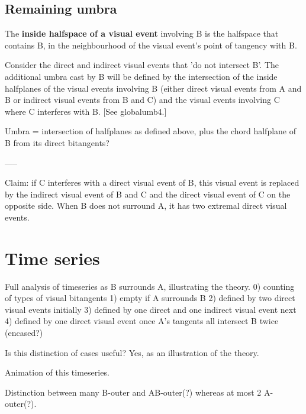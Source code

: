 \documentclass[12pt]{article}
\begin{document}
\subsection{Remaining umbra}

\begin{defn2}
The {\bf inside halfspace of a visual event} involving B is the halfspace that contains B,
in the neighbourhood of the visual event's point of tangency with B.
\end{defn2}

Consider the direct and indirect visual events that 'do not intersect B'.
The additional umbra cast by B will be defined by the intersection 
of the inside halfplanes of the visual events involving B (either direct visual
events from A and B or indirect visual events from B and C)
and the visual events involving C where C interferes with B.
[See globalumb4.]

Umbra = intersection of halfplanes as defined above, plus the chord halfplane of B
from its direct bitangents?

-----

Claim: if C interferes with a direct visual event of B, this visual event is replaced
       by the indirect visual event of B and C and the direct visual event of C on
       the opposite side.
       When B does not surround A, it has two extremal direct visual events.


\clearpage


\section{Time series}

Full analysis of timeseries as B surrounds A, illustrating the theory.
0) counting of types of visual bitangents
1) empty if A surrounds B
2) defined by two direct visual events initially
3) defined by one direct and one indirect visual event next
4) defined by one direct visual event once A's tangents all intersect B twice (encased?)

Is this distinction of cases useful? Yes, as an illustration of the theory.

Animation of this timeseries.

Distinction between many B-outer and AB-outer(?) whereas at most 2 A-outer(?).
\end{document}
